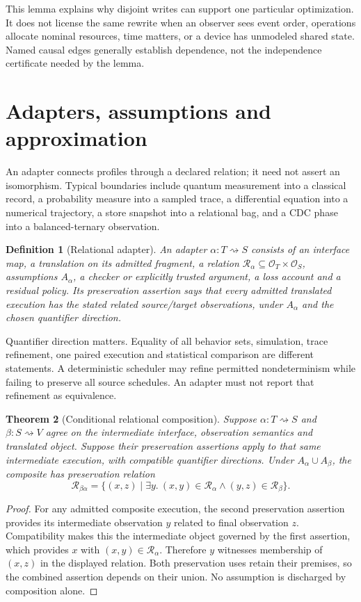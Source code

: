 \documentclass[11pt]{article}
\newtheorem{definition}{Definition}[section]
\newtheorem{theorem}[definition]{Theorem}
\theoremstyle{remark}
\begin{document}
This lemma explains why disjoint writes can support one particular
optimization. It does not license the same rewrite when an observer sees
event order, operations allocate nominal resources, time matters, or a
device has unmodeled shared state. Named causal edges generally establish
dependence, not the independence certificate needed by the lemma.

\section{Adapters, assumptions and approximation}
\label{sec:adapters}

An adapter connects profiles through a declared relation; it need not assert
an isomorphism. Typical boundaries include quantum measurement into a
classical record, a probability measure into a sampled trace, a differential
equation into a numerical trajectory, a store snapshot into a relational bag,
and a CDC phase into a balanced-ternary observation.

\begin{definition}[Relational adapter]
An adapter $\alpha:T\rightsquigarrow S$ consists of an interface map,
a translation on its admitted fragment, a relation
$\mathcal R_\alpha\subseteq\mathcal O_T\times\mathcal O_S$, assumptions
$A_\alpha$, a checker or explicitly trusted argument, a loss account and a
residual policy. Its preservation assertion says that every admitted
translated execution has the stated related source/target observations,
under $A_\alpha$ and the chosen quantifier direction.
\end{definition}

Quantifier direction matters. Equality of all behavior sets, simulation,
trace refinement, one paired execution and statistical comparison are
different statements. A deterministic scheduler may refine permitted
nondeterminism while failing to preserve all source schedules. An adapter
must not report that refinement as equivalence.

\begin{theorem}[Conditional relational composition]
Suppose $\alpha:T\rightsquigarrow S$ and
$\beta:S\rightsquigarrow V$ agree on the intermediate interface,
observation semantics and translated object. Suppose their preservation
assertions apply to that same intermediate execution, with compatible
quantifier directions. Under $A_\alpha\cup A_\beta$, the composite has
preservation relation
\[
 \mathcal R_{\beta\alpha}
 =\{(x,z)\mid \exists y.\ (x,y)\in\mathcal R_\alpha
                    \land(y,z)\in\mathcal R_\beta\}.
\]
\end{theorem}
\begin{proof}
For any admitted composite execution, the second preservation assertion
provides its intermediate observation $y$ related to final observation $z$.
Compatibility makes this the intermediate object governed by the first
assertion, which provides $x$ with $(x,y)\in\mathcal R_\alpha$. Therefore
$y$ witnesses membership of $(x,z)$ in the displayed relation. Both
preservation uses retain their premises, so the combined assertion depends
on their union. No assumption is discharged by composition alone.
\end{proof}
\end{document}
